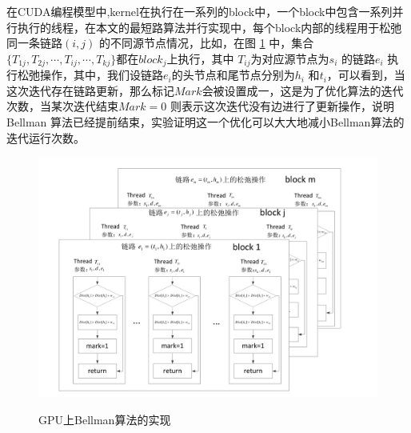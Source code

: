 在CUDA编程模型中,kernel在执行在一系列的block中，一个block中包含一系列并行执行的线程，在本文的最短路算法并行实现中，每个block内部的线程用于松弛同一条链路$(i,j)$ 的不同源节点情况，比如，在图 \ref{GB} 中，集合$\{T_{1j}, T_{2j}, \cdots, T_{ij}, \cdots, T_{kj}\}$都在$block_j$上执行，其中 $T_{ij}$为对应源节点为$s_i$ 的链路$e_i$ 执行松弛操作，其中，我们设链路$e_i$的头节点和尾节点分别为$h_i$ 和$t_i$，可以看到，当这次迭代存在链路更新，那么标记$Mark$会被设置成一，这是为了优化算法的迭代次数，当某次迭代结束$Mark=0$ 则表示这次迭代没有边进行了更新操作，说明Bellman 算法已经提前结束，实验证明这一个优化可以大大地减小Bellman算法的迭代运行次数。
\begin{figure}
\setlength{\belowcaptionskip}{-0.5cm}
\begin{center}
{\includegraphics[width=1 \textwidth]{figures/GPUimpl.pdf}}
\end{center}
\caption{{\footnotesize{GPU上Bellman算法的实现}}}
\label{GB}
\end{figure}

